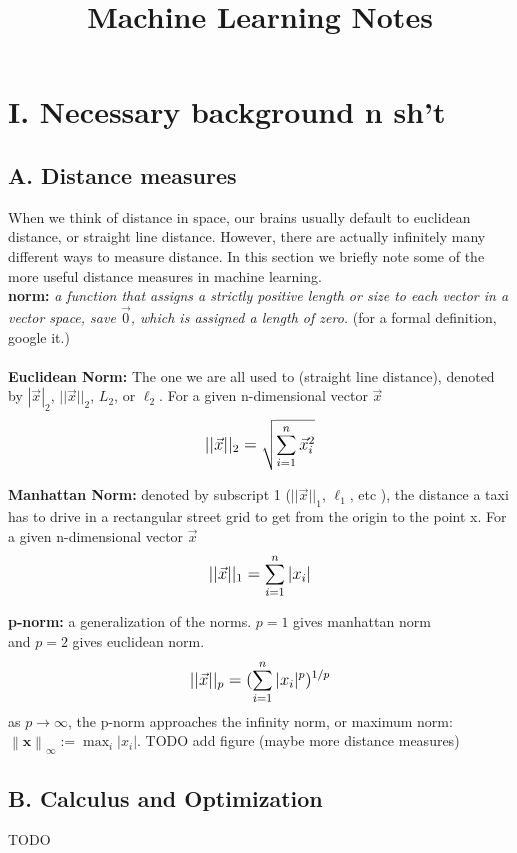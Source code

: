 \documentclass[10pt]{article}
\begin{document}
\title{Machine Learning Notes}
\maketitle

\section*{I. Necessary background n sh't}
	\subsection*{A. Distance measures}
		When we think of distance in space, our brains usually default to euclidean distance, or straight line distance. 
		However, there are actually infinitely many different ways to measure distance. In this section we briefly
		note some of the more useful distance measures in machine learning. \\
		
		\noindent \textbf{norm:}\textit{ a function that assigns a strictly positive length or size to each vector in a 
		vector space, save $\vec{0}$, which is assigned a length of zero.} (for a formal definition, google it.) \\ \\
    		
		\indent \textbf{Euclidean Norm:} The one we are all used to (straight line distance), 
		\indent denoted by $ |\vec x|_2 $, $ ||\vec x||_2$, $L_2$, or $\ell_2 $. For a given n-dimensional vector $\vec x$
			$$  \mathlarger{||\vec x||_2 = \sqrt {\sum_{i=1}^n \vec x_i^2} } $$
			
		\indent \textbf{Manhattan Norm:} denoted by subscript 1 ($ ||\vec x||_1$,  $\ell_1$, etc ), the distance 
		\indent a taxi has to drive in a rectangular street grid to get from the origin to 
		\indent the point x. For a given n-dimensional vector $\vec x$
		$$  \mathlarger{ ||\vec x||_1 = \sum_{i=1}^n | x_i | }$$
		
		\textbf{p-norm:} a generalization of the norms. $p = 1$ gives manhattan norm \\
		\indent and $p=2$ gives euclidean norm. 
		$$ \mathlarger{ ||\vec x||_p = (\sum_{i=1}^n | x_i |^p)^{1/p}} $$
		\indent as $p \rightarrow \infty $, the p-norm approaches the infinity norm, or maximum norm:
		\indent $ \left\|\mathbf {x} \right\|_{\infty }:=\max _{i}\left|x_{i}\right|. $
		TODO add figure (maybe more distance measures)
		\subsection*{B. Calculus and Optimization}
			TODO
\end{document}

